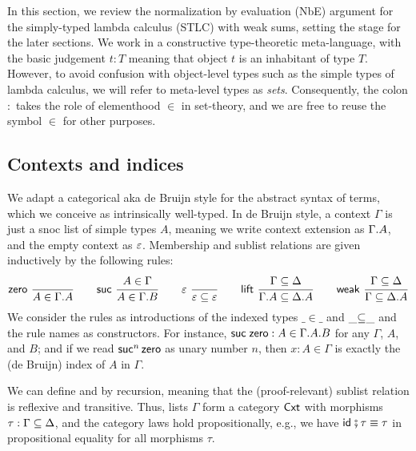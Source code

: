 \documentclass[a4paper,USenglish,cleveref, autoref]{lipics-v2019}
\begin{document}
In this section, we review the normalization by evaluation (NbE)
argument for the simply-typed lambda calculus (STLC) with weak sums, setting
the stage for the later sections.
%
We work in a constructive type-theoretic meta-language, with the basic judgement
$t : T$ meaning that object $t$ is an inhabitant of type $T$.
However, to avoid confusion with object-level types such as the simple
types of lambda calculus, we will refer to meta-level types as
\emph{sets}.  Consequently, the colon $:$
takes the role of elementhood $\in$ in set-theory, and we are free to
reuse the symbol $\in$ for other purposes.

\subsection{Contexts and indices}

We adapt a categorical aka de Bruijn style for the abstract syntax of
terms, which we conceive as intrinsically well-typed.  In de Bruijn
style, a context $\Gamma$ is just a snoc list of simple types $A$,
meaning we write context extension as $\Gamma.A$, and the empty
context as $\varepsilon$.  Membership  and sublist
relations \fbox{$\Gamma \sublist \Delta$} are given inductively by the
following rules:
\begin{gather*}
  \nru{\tzero}{}{A \in \cext \Gamma A}
\qquad
  \nru{\tsuc}{A \in \Gamma}{A \in \cext \Gamma B}
\qquad
  \nru{\tdone}{}{\cempty \sublist \cempty}
\qquad
  \nru{\tlift}
    {\Gamma \sublist \Delta}
    {\cext \Gamma A \sublist \cext \Delta A}
\qquad
  \nru{\tweak}
    {\Gamma \sublist \Delta}
    {\Gamma \sublist \cext \Delta A}
\end{gather*}
We consider the rules as introductions of the indexed types
$\_{\in}\_$ and $\_{\subseteq}\_$ and the rule names as constructors.
For instance, $\mathsf{\mathsf{suc}\;\mathsf{zero}} : A \in \Gamma.A.B$ for any
$\Gamma$, $A$, and $B$; and if we read $\mathsf{suc}^n\,\mathsf{zero}$ as unary
number $n$, then $x : A \in \Gamma$ is exactly the (de Bruijn) index
of $A$ in $\Gamma$.

We can define
\fbox{$\tid : \Gamma \sublist \Gamma$} and \fbox{$\_{\rcomp}\_ : \Gamma
\sublist \Delta \to \Delta \sublist \Phi \to \Gamma \sublist \Phi$}
by recursion, meaning that the (proof-relevant)
sublist relation is reflexive and transitive.
Thus, lists $\Gamma$ form a category
$\mathsf{Cxt}$ with morphisms $\tau : \Gamma \subseteq \Delta$, and the category laws
hold propositionally, e.g., we have $\mathsf{id}_{} \fatsemi \tau \equiv \tau$ in
propositional equality for all morphisms $\tau$.
\end{document}
